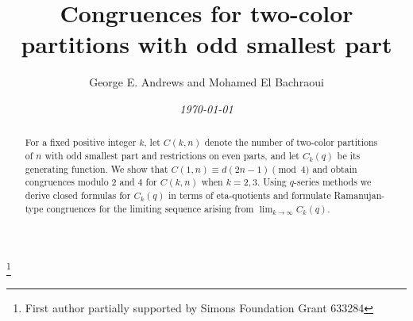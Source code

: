 \documentclass[reqno]{amsart}
\title[Congruences for two-color partitions]{Congruences for two-color partitions with odd smallest part}
\theoremstyle{definition}
\theoremstyle{plain}
\theoremstyle{remark}
\numberwithin{equation}{section}
\begin{document}
\author[ G. E. Andrews and M. El Bachraoui]{George E. Andrews and Mohamed El Bachraoui}
\address{The Pennsylvania State University, University Park, Pennsylvania 16802}
\address{Dept. Math. Sci,
United Arab Emirates University, PO Box 15551, Al-Ain, UAE}
%
\begin{abstract}
For a fixed positive integer $k$, let $C(k,n)$ denote the number of two-color partitions of $n$ with odd smallest part and restrictions on even parts, and let $C_k(q)$ be its generating function. We show that $C(1,n)\equiv d(2n-1)\pmod{4}$ and obtain congruences modulo $2$ and $4$ for $C(k,n)$ when $k=2,3$. Using $q$-series methods we derive closed formulas for $C_k(q)$ in terms of eta-quotients and formulate Ramanujan-type congruences for the limiting sequence arising from $\lim_{k\to\infty} C_k(q)$.
\end{abstract}
\date{\textit{\today}}
\thanks{First author partially supported by Simons Foundation Grant 633284}
\maketitle
%
\end{document}
